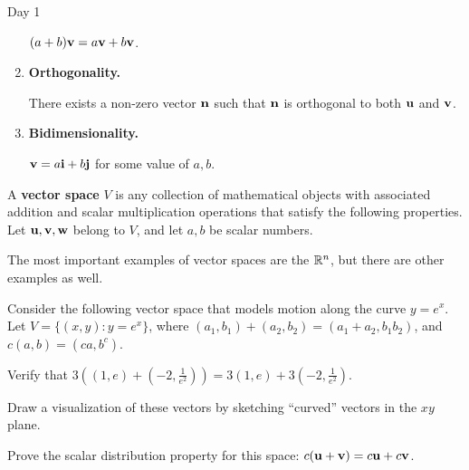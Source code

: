 \begin{applicationActivities}{Day 1}
\begin{activity}{25}
\begin{multicols}{2}
\begin{enumerate}
        \((a+b)\mathbf v=a\mathbf v+b\mathbf v\).
  \item \textbf{Orthogonality.}

        There exists a non-zero vector \(\mathbf n\) such that
        \(\mathbf n\) is orthogonal to both \(\mathbf u\) and \(\mathbf v\).
  \item \textbf{Bidimensionality.}

        \(\mathbf v=a\mathbf i+b\mathbf j\) for some value of \(a,b\).
\end{enumerate}
\end{multicols}
\end{activity}

\begin{definition}
  A \textbf{vector space} \(V\) is any collection of mathematical objects with
  associated addition and scalar multiplication operations that satisfy
  the following properties. Let \(\mathbf u,\mathbf v,\mathbf w\) belong to \(V\),
  and let \(a,b\) be scalar numbers.

  \vectorSpaceProperties
\end{definition}

\begin{definition}
  The most important examples of vector spaces are the  \(\mathbb{R}^n\), but there are other examples as well.
\end{definition}

\begin{activity}{25}
  Consider the following vector space that models motion along the curve
  \(y=e^x\). Let \(V=\{(x,y):y=e^x\}\), where
  \((a_1,b_1)+(a_2,b_2)=(a_1+a_2,b_1b_2)\), and \(c(a,b)=(ca,b^c)\).

  \begin{subactivity}
    Verify that \(3((1,e)+(-2,\frac{1}{e^2}))=
    3(1,e)+3(-2,\frac{1}{e^2})\).
  \end{subactivity}

  \begin{TBLnote}
    Draw a visualization of these vectors by sketching ``curved''
    vectors in the \(xy\) plane.
  \end{TBLnote}

  \begin{subactivity}
    Prove the scalar distribution property for this space:
    \(c(\mathbf u+\mathbf v)=c\mathbf u+c\mathbf v\).
  \end{subactivity}
\end{activity}



\end{applicationActivities}
